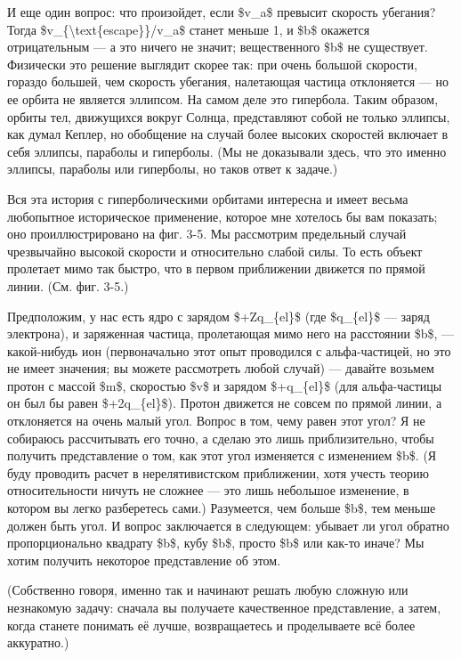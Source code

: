 \documentclass[10pt,oneside]{article}
\newcommand{\TipsSubsection}[1]{\par\vspace{6bp}{\normalsize\bfseries #1\par}\vspace{2bp}}
\begin{document}
И еще один вопрос: что произойдет, если \$v\_a\$ превысит скорость убегания? Тогда \$v\_\{\textbackslash{}text\{escape\}\}/v\_a\$ станет меньше 1, и \$b\$ окажется отрицательным --- а это ничего не значит; вещественного \$b\$ не существует. Физически это решение выглядит скорее так: при очень большой скорости, гораздо большей, чем скорость убегания, налетающая частица отклоняется --- но ее орбита не является эллипсом. На самом деле это гипербола. Таким образом, орбиты тел, движущихся вокруг Солнца, представляют собой не только эллипсы, как думал Кеплер, но обобщение на случай более высоких скоростей включает в себя эллипсы, параболы и гиперболы. (Мы не доказывали здесь, что это именно эллипсы, параболы или гиперболы, но таков ответ к задаче.)\par

\TipsSubsection{3-2 Открытие атомного ядра}

Вся эта история с гиперболическими орбитами интересна и имеет весьма любопытное историческое применение, которое мне хотелось бы вам показать; оно проиллюстрировано на фиг. 3-5. Мы рассмотрим предельный случай чрезвычайно высокой скорости и относительно слабой силы. То есть объект пролетает мимо так быстро, что в первом приближении движется по прямой линии. (См. фиг. 3-5.)\par

Предположим, у нас есть ядро с зарядом \$+Zq\_\{el\}\$ (где \$q\_\{el\}\$ --- заряд электрона), и заряженная частица, пролетающая мимо него на расстоянии \$b\$, --- какой-нибудь ион (первоначально этот опыт проводился с альфа-частицей, но это не имеет значения; вы можете рассмотреть любой случай) --- давайте возьмем протон с массой \$m\$, скоростью \$v\$ и зарядом \$+q\_\{el\}\$ (для альфа-частицы он был бы равен \$+2q\_\{el\}\$). Протон движется не совсем по прямой линии, а отклоняется на очень малый угол. Вопрос в том, чему равен этот угол? Я не собираюсь рассчитывать его точно, а сделаю это лишь приблизительно, чтобы получить представление о том, как этот угол изменяется с изменением \$b\$. (Я буду проводить расчет в нерелятивистском приближении, хотя учесть теорию относительности ничуть не сложнее --- это лишь небольшое изменение, в котором вы легко разберетесь сами.) Разумеется, чем больше \$b\$, тем меньше должен быть угол. И вопрос заключается в следующем: убывает ли угол обратно пропорционально квадрату \$b\$, кубу \$b\$, просто \$b\$ или как-то иначе? Мы хотим получить некоторое представление об этом.\par

(Собственно говоря, именно так и начинают решать любую сложную или незнакомую задачу: сначала вы получаете качественное представление, а затем, когда станете понимать её лучше, возвращаетесь и проделываете всё более аккуратно.)\par
\end{document}
